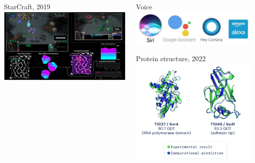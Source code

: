 \documentclass[fullscreen=true, bookmarks=true, hyperref={pdfencoding=unicode}]{beamer}
\begin{document}
\begin{frame}
\begin{columns}
\begin{column}{.3\paperwidth}
      \vspace{0.4cm}
      StarCraft, 2019
      \includegraphics[keepaspectratio,       width=.3\paperwidth]{starcraft.png}
      \end{column}
      
      \begin{column}{.3\paperwidth}
      Voice
      \includegraphics[keepaspectratio,       width=.3\paperwidth]{voice.jpg}
      
      \vspace{0.3cm}
      Protein structure, 2022
      \includegraphics[keepaspectratio,       width=.3\paperwidth]{AlphaFold.png}
      \end{column}
  \end{columns}

\end{frame}
\end{document}
